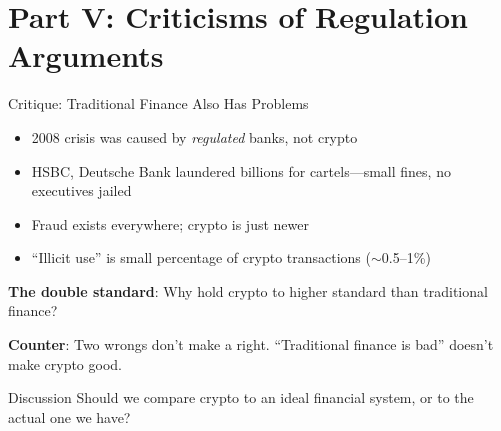 ﻿\documentclass[aspectratio=169,11pt]{beamer}
\begin{document}
\section{Part V: Criticisms of Regulation Arguments}

\begin{frame}{Critique: Traditional Finance Also Has Problems}
\begin{objectionbox}
\small
\begin{itemize}
    \item 2008 crisis was caused by \emph{regulated} banks, not crypto
    \item HSBC, Deutsche Bank laundered billions for cartels---small fines, no executives jailed
    \item Fraud exists everywhere; crypto is just newer
    \item ``Illicit use'' is small percentage of crypto transactions ($\sim$0.5--1\%)
\end{itemize}
\end{objectionbox}

\vspace{0.2em}
\textbf{The double standard}: Why hold crypto to higher standard than traditional finance?

\textbf{Counter}: Two wrongs don't make a right. ``Traditional finance is bad'' doesn't make crypto good.

\begin{alertblock}{Discussion}
Should we compare crypto to an ideal financial system, or to the actual one we have?
\end{alertblock}
\end{frame}
\end{document}

